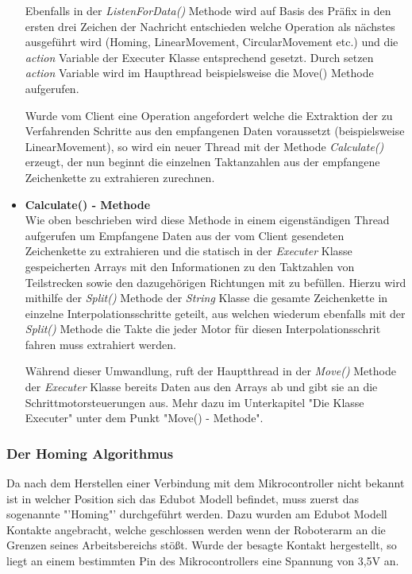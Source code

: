 \begin{itemize}
Ebenfalls in der \textit{ListenForData()} Methode wird auf Basis des Präfix in den ersten drei Zeichen der Nachricht entschieden welche Operation als nächstes ausgeführt wird (Homing, LinearMovement, CircularMovement etc.) und die \textit{action} Variable der Executer Klasse entsprechend gesetzt. Durch setzen \textit{action} Variable wird im Haupthread beispielsweise die Move() Methode aufgerufen.

Wurde vom Client eine Operation angefordert welche die Extraktion der zu Verfahrenden Schritte aus den empfangenen Daten voraussetzt (beispielsweise LinearMovement), so wird ein neuer Thread mit der Methode \textit{Calculate()} erzeugt, der nun beginnt die einzelnen Taktanzahlen aus der empfangene Zeichenkette zu extrahieren zurechnen.

\item \textbf{Calculate() - Methode}\\
Wie oben beschrieben wird diese Methode in einem eigenständigen Thread aufgerufen um Empfangene Daten aus der vom Client gesendeten Zeichenkette zu extrahieren und die statisch in der \textit{Executer} Klasse gespeicherten Arrays mit den Informationen zu den Taktzahlen von Teilstrecken sowie den dazugehörigen Richtungen mit zu befüllen. 
Hierzu wird mithilfe der \textit{Split()} Methode der \textit{String} Klasse die gesamte Zeichenkette in einzelne Interpolationsschritte geteilt, aus welchen wiederum ebenfalls mit der \textit{Split()} Methode die Takte die jeder Motor für diesen Interpolationsschrit fahren muss extrahiert werden.

Während dieser Umwandlung, ruft der Hauptthread in der \textit{Move()} Methode der \textit{Executer} Klasse bereits Daten aus den Arrays ab und gibt sie an die Schrittmotorsteuerungen aus. Mehr dazu im Unterkapitel "Die Klasse Executer" unter dem Punkt "Move() - Methode".

\end{itemize}
\subsubsection{Der Homing Algorithmus}
Da nach dem Herstellen einer Verbindung mit dem Mikrocontroller nicht bekannt ist in welcher Position sich das Edubot Modell befindet, muss zuerst das sogenannte "'Homing"' durchgeführt werden. Dazu wurden am Edubot Modell Kontakte angebracht, welche geschlossen werden wenn der Roboterarm an die Grenzen seines Arbeitsbereichs stößt. Wurde der besagte Kontakt hergestellt, so liegt an einem bestimmten Pin des Mikrocontrollers eine Spannung von 3,5V an. 

